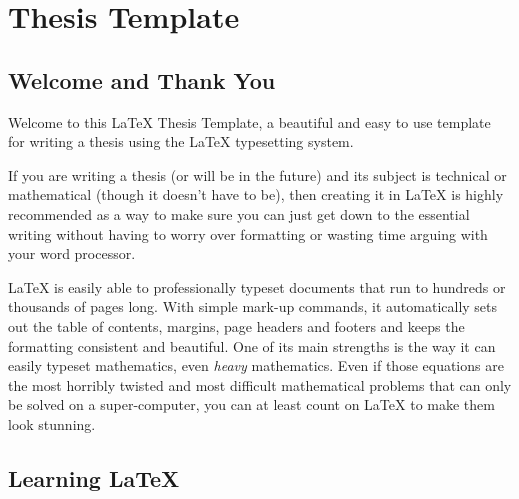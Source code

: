 \setcounter{chapter}{-1}
\chapter{Thesis Template} %

\label{Chapter0} %


\newcommand{\keyword}[1]{\textbf{#1}}
\newcommand{\tabhead}[1]{\textbf{#1}}
\newcommand{\code}[1]{\texttt{#1}}
\newcommand{\file}[1]{\texttt{\bfseries#1}}
\newcommand{\option}[1]{\texttt{\itshape#1}}


\section{Welcome and Thank You}
Welcome to this \LaTeX{} Thesis Template, a beautiful and easy to use template for writing a thesis using the \LaTeX{} typesetting system.

If you are writing a thesis (or will be in the future) and its subject is
technical or mathematical (though it doesn't have to be), then creating it in
\LaTeX{} is highly recommended as a way to make sure you can just get down to
the essential writing without having to worry over formatting or wasting time
arguing with your word processor.

\LaTeX{} is easily able to professionally typeset documents that run to hundreds
or thousands of pages long. With simple mark-up commands, it automatically sets
out the table of contents, margins, page headers and footers and keeps the
formatting consistent and beautiful. One of its main strengths is the way it can
easily typeset mathematics, even \emph{heavy} mathematics. Even if those
equations are the most horribly twisted and most difficult mathematical problems
that can only be solved on a super-computer, you can at least count on \LaTeX{}
to make them look stunning.


\section{Learning \LaTeX{}}


